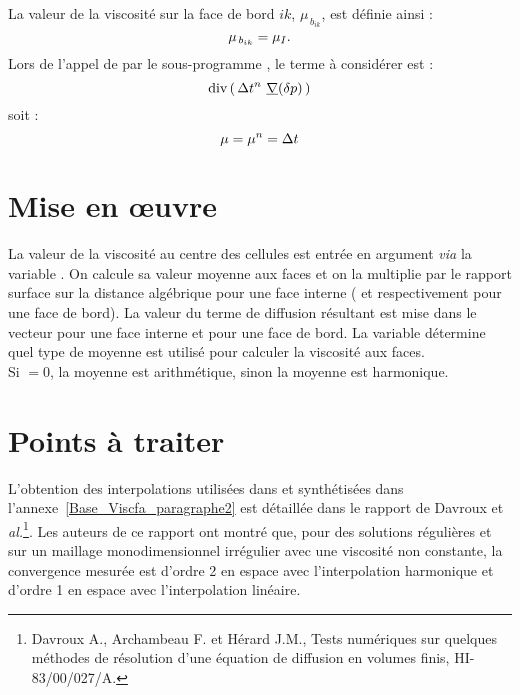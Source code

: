 La valeur de la viscosité sur la face de bord $ik$, $\mu_{\,b_{ik}}$, est définie
ainsi :\\
\begin{equation}\notag
\mu_{\,b_{ik}}=\mu_I.
\end{equation}
Lors de l'appel de  par le sous-programme , le terme
\`a consid\'erer est :
\begin{equation}\notag
\text{div}\, (\,\Delta t^n \ \underline{\nabla}(\delta p)\,)
\end{equation}
soit :
\begin{equation}\notag
\mu = \mu^n = \Delta t
\end{equation}

\section*{Mise en \oe uvre}
La valeur de la viscosité au centre des cellules est entrée en argument {\it
  via} la variable . On calcule sa valeur moyenne aux faces et on
la multiplie par le rapport surface  sur la distance alg\'ebrique
 pour une face interne ( et  respectivement
pour une face de bord). La valeur du terme de diffusion résultant est mise dans
le vecteur  pour une face interne et  pour une face de
bord.  La variable  détermine quel type de moyenne est utilisé pour
calculer la viscosité aux faces.\\
Si $=0$, la moyenne est arithmétique, sinon la moyenne est harmonique.\\

\section*{Points \`a traiter}
L'obtention des interpolations utilisées dans \CS et synthétisées dans
l'annexe~\ref{Base_Viscfa_paragraphe2} est détaillée dans le rapport de Davroux
et \textit{al.}\footnote{%
  Davroux A., Archambeau F. et Hérard J.M., Tests numériques sur quelques
  méthodes de résolution d'une équation de diffusion en volumes finis,
  HI-83/00/027/A.}.
%
Les auteurs de ce rapport ont montré que, pour des solutions régulières et sur
un maillage monodimensionnel irrégulier avec une viscosité non constante, la
convergence mesurée est d'ordre 2 en espace avec l'interpolation harmonique et
d'ordre 1 en espace avec l'interpolation linéaire.

